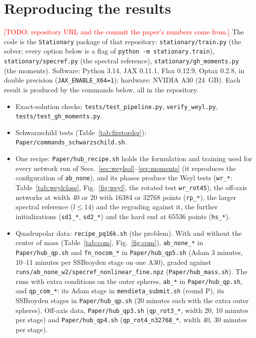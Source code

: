 \documentclass[aps,prd,twocolumn,superscriptaddress, nofootinbib,floatfix]{revtex4-2}
\newcommand{\todo}[1]{\textcolor{red}{[TODO: #1]}}
\begin{document}
\section{Reproducing the results}\label{app:repro}

\todo{repository URL and the commit the paper's numbers come from.} The code is the \texttt{Stationary} package of that repository: \texttt{stationary/train.py} (the solver; every option below is a flag of \texttt{python -m stationary.train}), \texttt{stationary/specref.py} (the spectral reference), \texttt{stationary/gh\_moments.py} (the moments).
Software: Python 3.14, JAX 0.11.1, Flax 0.12.9, Optax 0.2.8, in double precision (\texttt{JAX\_ENABLE\_X64=1}); hardware: NVIDIA A30 (24~GB).
Each result is produced by the commands below, all in the repository.
\begin{itemize}
\item Exact-solution checks: \texttt{tests/test\_pipeline.py}, \texttt{verify\_weyl.py}, \texttt{tests/test\_gh\_moments.py}.
\item Schwarzschild tests (Table~\ref{tab:firstorder}): \texttt{Paper/commands\_schwarzschild.sh}.
\item One recipe: \texttt{Paper/hub\_recipe.sh} holds the formulation and training used for every network run of Secs.~\ref{sec:weylsol}--\ref{sec:moments} (it reproduces the configuration of \texttt{ab\_none}), and its phases produce the Weyl tests (\texttt{wr\_*}: Table~\ref{tab:weylclose}, Fig.~\ref{fig:weyl}, the rotated test \texttt{wr\_rot45}), the off-axis networks at width 40 or 20 with 16384 or 32768 points (\texttt{rp\_*}), the larger spectral reference ($l\le14$) and the regrading against it, the further initializations (\texttt{sd1\_*}, \texttt{sd2\_*}) and the hard end at 65536 points (\texttt{hs\_*}).
\item Quadrupolar data: \texttt{recipe\_pq16k.sh} (the problem).
With and without the center of mass (Table~\ref{tab:com}, Fig.~\ref{fig:com}), \texttt{ab\_none\_*} in \texttt{Paper/hub\_qp.sh} and \texttt{fn\_nocom\_*} in \texttt{Paper/hub\_qp5.sh} (Adam 3 minutes, 10--11 minutes per SSBroyden stage on one A30), graded against \texttt{runs/ab\_none\_w2/specref\_nonlinear\_fine.npz} (\texttt{Paper/hub\_mass.sh}).
The runs with extra conditions on the outer spheres, \texttt{ab\_*} in \texttt{Paper/hub\_qp.sh}, and \texttt{qp\_com\_*}: its Adam stage in \texttt{mendieta\_submit.sh} (round P), its SSBroyden stages in \texttt{Paper/hub\_qp.sh} (20 minutes each with the extra outer spheres).
Off-axis data, \texttt{Paper/hub\_qp3.sh} (\texttt{qp\_rot3\_*}, width 20, 10 minutes per stage) and \texttt{Paper/hub\_qp4.sh} (\texttt{qp\_rot4\_n32768\_*}, width 40, 30 minutes per stage).

\end{itemize}
\end{document}

